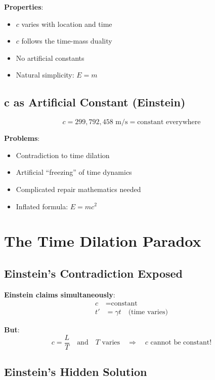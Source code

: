 	\textbf{Properties}:
	\begin{itemize}
		\item $c$ varies with location and time
		\item $c$ follows the time-mass duality
		\item No artificial constants
		\item Natural simplicity: $E = m$
	\end{itemize}
	
	\subsection{c as Artificial Constant (Einstein)}
	
	\begin{equation}
		c = 299,792,458 \text{ m/s} = \text{constant everywhere}
	\end{equation}
	
	\textbf{Problems}:
	\begin{itemize}
		\item Contradiction to time dilation
		\item Artificial ``freezing'' of time dynamics
		\item Complicated repair mathematics needed
		\item Inflated formula: $E = mc^2$
	\end{itemize}
	
	\section{The Time Dilation Paradox}
	
	\subsection{Einstein's Contradiction Exposed}
	
	\textbf{Einstein claims simultaneously}:
	\begin{align}
		c &= \text{constant} \\
		t' &= \gamma t \quad \text{(time varies)}
	\end{align}
	
	\textbf{But}:
	\begin{equation}
		c = \frac{L}{T} \quad \text{and} \quad T \text{ varies} \quad \Rightarrow \quad c \text{ cannot be constant!}
	\end{equation}
	
	\subsection{Einstein's Hidden Solution}
	
